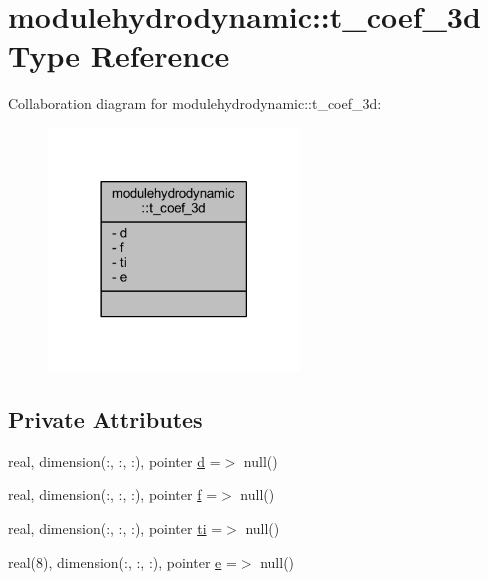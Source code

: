 \hypertarget{structmodulehydrodynamic_1_1t__coef__3d}{}\section{modulehydrodynamic\+:\+:t\+\_\+coef\+\_\+3d Type Reference}
\label{structmodulehydrodynamic_1_1t__coef__3d}


Collaboration diagram for modulehydrodynamic\+:\+:t\+\_\+coef\+\_\+3d\+:\nopagebreak
\begin{figure}[H]
\begin{center}
\leavevmode
\includegraphics[width=189pt]{structmodulehydrodynamic_1_1t__coef__3d__coll__graph}
\end{center}
\end{figure}
\subsection*{Private Attributes}
\begin{DoxyCompactItemize}
\item 
real, dimension(\+:, \+:, \+:), pointer \mbox{\hyperlink{structmodulehydrodynamic_1_1t__coef__3d_a1fa5c4677dc831bda46ff01dbadb305b}{d}} =$>$ null()
\item 
real, dimension(\+:, \+:, \+:), pointer \mbox{\hyperlink{structmodulehydrodynamic_1_1t__coef__3d_acded952a919c16d3cc8b6b2cfaca978e}{f}} =$>$ null()
\item 
real, dimension(\+:, \+:, \+:), pointer \mbox{\hyperlink{structmodulehydrodynamic_1_1t__coef__3d_a444f10fb604e6ee056cd3290fdc532d8}{ti}} =$>$ null()
\item 
real(8), dimension(\+:, \+:, \+:), pointer \mbox{\hyperlink{structmodulehydrodynamic_1_1t__coef__3d_a7fd18cd4423b4906683707814c49722f}{e}} =$>$ null()
\end{DoxyCompactItemize}



